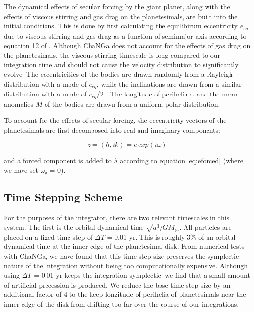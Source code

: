 \documentclass[onecolumn]{aastex63}
\begin{document}
The dynamical effects of secular forcing by the giant planet, along with  the effects of viscous stirring and gas drag on the planetesimals, are 
built into the initial conditions. This is done by first calculating the equilibirum eccentricity $e_{eq}$ due to viscous stirring and gas drag as a 
function of semimajor axis according to equation 12 of \citet{2002ApJ...581..666K}. Although {\sc ChaNGa} does not account for the effects of 
gas drag on the planetesimals, the viscous stirring timescale is long compared to our integration time and should not cause the velocity 
distribution to significantly evolve. The eccentricities of the bodies are drawn randomly from a Rayleigh distribution with a mode of $e_{eq}$, 
while the inclinations are drawn from a similar distribution with a mode of $e_{eq}$/2 \citep{1993MNRAS.263..875I}. The longitude of perihelia 
$\omega$ and the mean anomalies $M$ of the bodies are drawn from a uniform polar distribution.

To account for the effects of secular forcing, the eccentricity vectors of the planetesimals are first decomposed into real and imaginary 
components:

\begin{equation}\label{eq:hk}
	z = (h, ik) = e \, exp(i \omega)
\end{equation}

\noindent and a forced component is added to $h$ according to equation \ref{eq:eforced} (where we have set $\omega_{g}$ = 0).

\subsection{Time Stepping Scheme}\label{sec:timestep}

For the purposes of the integrator, there are two relevant timescales in this system. The first is the orbital dynamical time $\sqrt{a^3/
G M_{\odot}}$. All particles are placed on a fixed time step of $\Delta T$ = 0.01 yr. This is roughly 3\% of an orbital dynamical time at 
the inner edge of the planetesimal disk. From numerical tests with {\sc ChaNGa}, we have found that this time step size preserves 
the symplectic nature of the integration without being too computationally expensive. Although using $\Delta T$ = 0.01 yr keeps the 
integration symplectic, we find that a small amount of artificial precession is produced. We reduce the base time step size by an additional 
factor of 4 to the keep longitude of perihelia of planetesimals near the inner edge of the disk from drifting too far over the course of our 
integrations.
\end{document}
